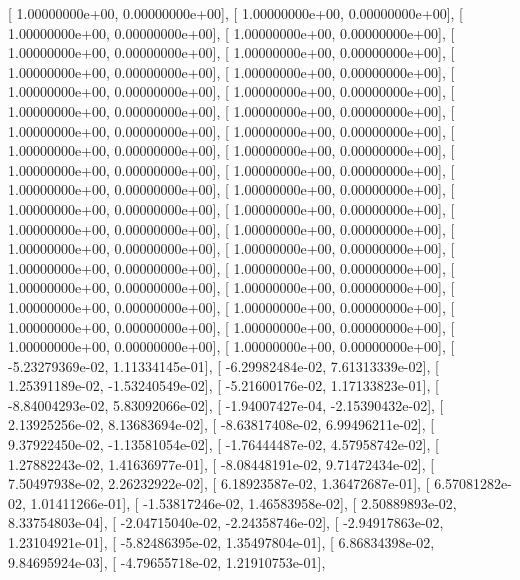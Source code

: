 \documentclass{article}
\begin{document}
       [  1.00000000e+00,   0.00000000e+00],
       [  1.00000000e+00,   0.00000000e+00],
       [  1.00000000e+00,   0.00000000e+00],
       [  1.00000000e+00,   0.00000000e+00],
       [  1.00000000e+00,   0.00000000e+00],
       [  1.00000000e+00,   0.00000000e+00],
       [  1.00000000e+00,   0.00000000e+00],
       [  1.00000000e+00,   0.00000000e+00],
       [  1.00000000e+00,   0.00000000e+00],
       [  1.00000000e+00,   0.00000000e+00],
       [  1.00000000e+00,   0.00000000e+00],
       [  1.00000000e+00,   0.00000000e+00],
       [  1.00000000e+00,   0.00000000e+00],
       [  1.00000000e+00,   0.00000000e+00],
       [  1.00000000e+00,   0.00000000e+00],
       [  1.00000000e+00,   0.00000000e+00],
       [  1.00000000e+00,   0.00000000e+00],
       [  1.00000000e+00,   0.00000000e+00],
       [  1.00000000e+00,   0.00000000e+00],
       [  1.00000000e+00,   0.00000000e+00],
       [  1.00000000e+00,   0.00000000e+00],
       [  1.00000000e+00,   0.00000000e+00],
       [  1.00000000e+00,   0.00000000e+00],
       [  1.00000000e+00,   0.00000000e+00],
       [  1.00000000e+00,   0.00000000e+00],
       [  1.00000000e+00,   0.00000000e+00],
       [  1.00000000e+00,   0.00000000e+00],
       [  1.00000000e+00,   0.00000000e+00],
       [  1.00000000e+00,   0.00000000e+00],
       [  1.00000000e+00,   0.00000000e+00],
       [  1.00000000e+00,   0.00000000e+00],
       [  1.00000000e+00,   0.00000000e+00],
       [  1.00000000e+00,   0.00000000e+00],
       [  1.00000000e+00,   0.00000000e+00],
       [  1.00000000e+00,   0.00000000e+00],
       [  1.00000000e+00,   0.00000000e+00],
       [ -5.23279369e-02,   1.11334145e-01],
       [ -6.29982484e-02,   7.61313339e-02],
       [  1.25391189e-02,  -1.53240549e-02],
       [ -5.21600176e-02,   1.17133823e-01],
       [ -8.84004293e-02,   5.83092066e-02],
       [ -1.94007427e-04,  -2.15390432e-02],
       [  2.13925256e-02,   8.13683694e-02],
       [ -8.63817408e-02,   6.99496211e-02],
       [  9.37922450e-02,  -1.13581054e-02],
       [ -1.76444487e-02,   4.57958742e-02],
       [  1.27882243e-02,   1.41636977e-01],
       [ -8.08448191e-02,   9.71472434e-02],
       [  7.50497938e-02,   2.26232922e-02],
       [  6.18923587e-02,   1.36472687e-01],
       [  6.57081282e-02,   1.01411266e-01],
       [ -1.53817246e-02,   1.46583958e-02],
       [  2.50889893e-02,   8.33754803e-04],
       [ -2.04715040e-02,  -2.24358746e-02],
       [ -2.94917863e-02,   1.23104921e-01],
       [ -5.82486395e-02,   1.35497804e-01],
       [  6.86834398e-02,   9.84695924e-03],
       [ -4.79655718e-02,   1.21910753e-01],
\end{document}
